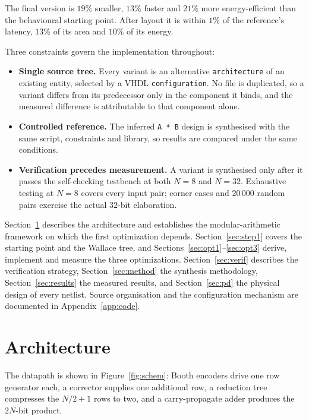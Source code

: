 \documentclass[11pt,a4paper]{article}
\begin{document}
The final version is $19\%$ smaller, $13\%$ faster and $21\%$ more
energy-efficient than the behavioural starting point. After layout it is
within $1\%$ of the reference's latency, $13\%$ of its area and $10\%$ of its
energy.

Three constraints govern the implementation throughout:

\begin{itemize}\itemsep2pt
\item \textbf{Single source tree.} Every variant is an alternative
      \texttt{architecture} of an existing entity, selected by a VHDL
      \texttt{configuration}. No file is duplicated, so a variant differs from
      its predecessor only in the component it binds, and the measured
      difference is attributable to that component alone.
\item \textbf{Controlled reference.} The inferred \texttt{A * B} design is
      synthesised with the same script, constraints and library, so results are
      compared under the same conditions.
\item \textbf{Verification precedes measurement.} A variant is synthesised only
      after it passes the self-checking testbench at both $N=8$ and $N=32$.
      Exhaustive testing at $N=8$ covers every input pair; corner cases and
      $20\,000$ random pairs exercise the actual $32$-bit elaboration.
\end{itemize}

Section~\ref{sec:arch} describes the architecture and establishes the
modular-arithmetic framework on which the first optimization depends.
Section~\ref{sec:step1} covers the starting point and the Wallace tree, and
Sections~\ref{sec:opt1}--\ref{sec:opt3} derive, implement and measure the three
optimizations. Section~\ref{sec:verif} describes the verification strategy,
Section~\ref{sec:method} the synthesis methodology,
Section~\ref{sec:results} the measured results, and Section~\ref{sec:pd} the
physical design of every netlist. Source organisation and the
configuration mechanism are documented in Appendix~\ref{app:code}.

\section{Architecture}
\label{sec:arch}

The datapath is shown in Figure~\ref{fig:schem}: Booth encoders drive one
row generator each, a corrector supplies one additional row, a reduction tree
compresses the $N/2+1$ rows to two, and a carry-propagate adder produces the
$2N$-bit product.
\end{document}

